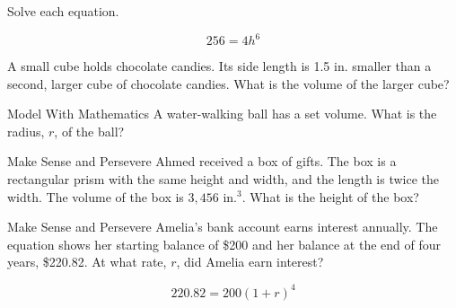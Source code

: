 \documentclass{article}
\newenvironment{practice}[2]{}{}        %
\newcommand{\answer}[1]{}               %
\newcommand{\placeholder}[2]{}          %
\begin{document}
\begin{practice}{42}{1}
Solve each equation.

\[
256=4h^6
\]

\answer{\(\pm2\)}
\end{practice}

\begin{practice}{43}{2}
A small cube holds chocolate candies. Its side length is 1.5 in. smaller than a second, larger cube of chocolate candies. What is the volume of the larger cube?

\placeholder{illustration}{Two chocolate candy boxes. Smaller box labeled "DARK Chocolate" with label "Volume is 85 in.^3"; larger box labeled "Milk CHOCOLATE."}

\answer{\(\approx205\text{ in.}^3\)}
\end{practice}

\begin{practice}{44}{2}
Model With Mathematics A water-walking ball has a set volume. What is the radius, \(r\), of the ball?

\placeholder{illustration}{Person inside a transparent water-walking ball floating on water; label reads "volume \approx 4.19 m^3."}

\answer{1 m}
\end{practice}

\begin{practice}{45}{2}
Make Sense and Persevere Ahmed received a box of gifts. The box is a rectangular prism with the same height and width, and the length is twice the width. The volume of the box is \(3,456\text{ in.}^3\). What is the height of the box?


\answer{12 in.}
\end{practice}

\begin{practice}{46}{2}
Make Sense and Persevere Amelia's bank account earns interest annually. The equation shows her starting balance of \$200 and her balance at the end of four years, \$220.82. At what rate, \(r\), did Amelia earn interest?

\[
220.82=200(1+r)^4
\]

\answer{0.025 or 2.5\%}
\end{practice}
\end{document}
